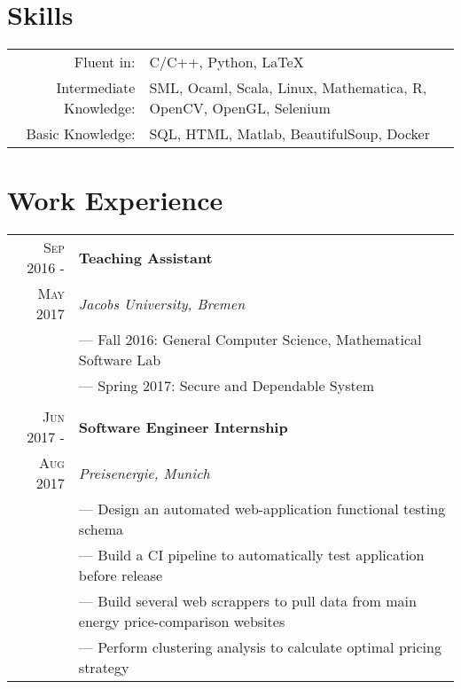 \documentclass[a4paper,10pt]{article}
\begin{document}
	
	\section{Skills}
	\begin{tabular}{rl}
		Fluent in: & C/C++, Python, LaTeX\\
		Intermediate Knowledge:& SML, Ocaml, Scala, Linux, Mathematica, R, OpenCV, OpenGL, Selenium\\
		Basic Knowledge:& SQL, HTML, Matlab, BeautifulSoup, Docker\\
	\end{tabular}
	
	
	
	\section{Work Experience}
	\begin{tabular}{r|l}
		\textsc{Sep 2016 - } & \textbf{Teaching Assistant} \\\textsc{May 2017}&\emph{Jacobs University, Bremen}
		\\& --- Fall 2016: General Computer Science, Mathematical Software Lab
		\\& --- Spring 2017: Secure and Dependable System
		\\ \multicolumn{1}{c}{} \\
		\textsc{Jun 2017 - } & \textbf{Software Engineer Internship} \\\textsc{Aug 2017}&\emph{Preisenergie, Munich}
		\\& --- Design an automated web-application functional testing schema
		\\& --- Build a CI pipeline to automatically test application before release
		\\& --- Build several web scrappers to pull data from main energy price-comparison websites
		\\& --- Perform clustering analysis to calculate optimal pricing strategy
	\end{tabular}
	
\end{document}
